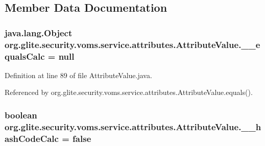 \subsection{Member Data Documentation}
\hypertarget{classorg_1_1glite_1_1security_1_1voms_1_1service_1_1attributes_1_1AttributeValue_acd87aec60573e754e6fccb6490b6e70a}{
\subsubsection[{\_\-\_\-equalsCalc}]{\setlength{\rightskip}{0pt plus 5cm}java.lang.Object {\bf org.glite.security.voms.service.attributes.AttributeValue.\_\-\_\-equalsCalc} = null}}
\label{classorg_1_1glite_1_1security_1_1voms_1_1service_1_1attributes_1_1AttributeValue_acd87aec60573e754e6fccb6490b6e70a}


Definition at line 89 of file AttributeValue.java.



Referenced by org.glite.security.voms.service.attributes.AttributeValue.equals().

\hypertarget{classorg_1_1glite_1_1security_1_1voms_1_1service_1_1attributes_1_1AttributeValue_a6c0c0a14443e29ef8d0994afc223e593}{
\subsubsection[{\_\-\_\-hashCodeCalc}]{\setlength{\rightskip}{0pt plus 5cm}boolean {\bf org.glite.security.voms.service.attributes.AttributeValue.\_\-\_\-hashCodeCalc} = false}}
\label{classorg_1_1glite_1_1security_1_1voms_1_1service_1_1attributes_1_1AttributeValue_a6c0c0a14443e29ef8d0994afc223e593}


